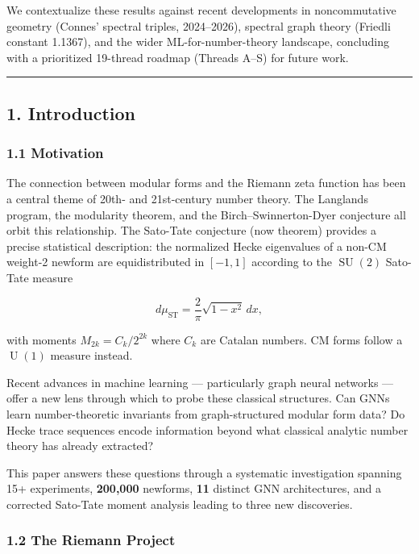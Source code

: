 \documentclass[
]{article}
\begin{document}
We contextualize these results against recent developments in
noncommutative geometry (Connes' spectral triples, 2024--2026), spectral
graph theory (Friedli constant 1.1367), and the wider
ML-for-number-theory landscape, concluding with a prioritized 19-thread
roadmap (Threads A--S) for future work.

\begin{center}\rule{0.5\linewidth}{0.5pt}\end{center}

\hypertarget{introduction}{%
\subsection{1. Introduction}\label{introduction}}

\hypertarget{motivation}{%
\subsubsection{1.1 Motivation}\label{motivation}}

The connection between modular forms and the Riemann zeta function has
been a central theme of 20th- and 21st-century number theory. The
Langlands program, the modularity theorem, and the
Birch--Swinnerton-Dyer conjecture all orbit this relationship. The
Sato-Tate conjecture (now theorem) provides a precise statistical
description: the normalized Hecke eigenvalues of a non-CM weight-2
newform are equidistributed in \([-1,1]\) according to the
\(\operatorname{SU}(2)\) Sato-Tate measure

\[d\mu_{\text{ST}} = \frac{2}{\pi}\sqrt{1-x^2}\,dx,\]

with moments \(M_{2k} = C_k / 2^{2k}\) where \(C_k\) are Catalan
numbers. CM forms follow a \(\operatorname{U}(1)\) measure instead.

Recent advances in machine learning --- particularly graph neural
networks --- offer a new lens through which to probe these classical
structures. Can GNNs learn number-theoretic invariants from
graph-structured modular form data? Do Hecke trace sequences encode
information beyond what classical analytic number theory has already
extracted?

This paper answers these questions through a systematic investigation
spanning 15+ experiments, \textbf{200,000} newforms, \textbf{11}
distinct GNN architectures, and a corrected Sato-Tate moment analysis
leading to three new discoveries.

\hypertarget{the-riemann-project}{%
\subsubsection{1.2 The Riemann Project}\label{the-riemann-project}}
\end{document}
